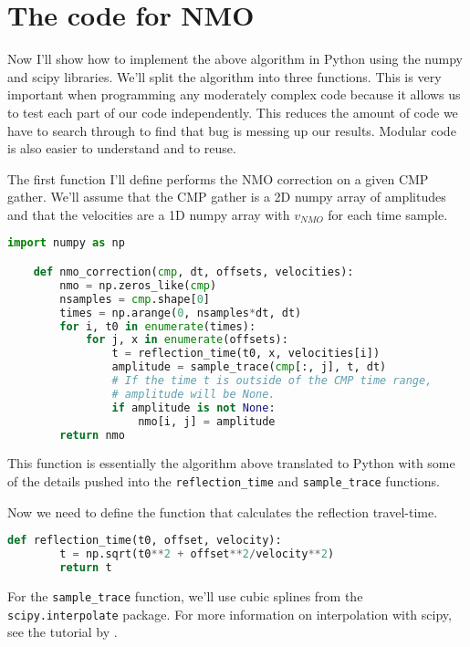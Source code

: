 \section{The code for NMO}

Now I'll show how to implement the above algorithm in Python using the numpy and scipy libraries.
We'll split the algorithm into three functions.
This is very important when programming any moderately complex code because it allows us to test each part of our code independently.
This reduces the amount of code we have to search through to find that bug is messing up our results.
Modular code is also easier to understand and to reuse.

The first function I'll define performs the NMO correction on a given CMP gather.
We'll assume that the CMP gather is a 2D numpy array of amplitudes and that the
velocities are a 1D numpy array with $v_{NMO}$ for each time sample.

\begin{lstlisting}[language=python]
    import numpy as np

    def nmo_correction(cmp, dt, offsets, velocities):
        nmo = np.zeros_like(cmp)
        nsamples = cmp.shape[0]
        times = np.arange(0, nsamples*dt, dt)
        for i, t0 in enumerate(times):
            for j, x in enumerate(offsets):
                t = reflection_time(t0, x, velocities[i])
                amplitude = sample_trace(cmp[:, j], t, dt)
                # If the time t is outside of the CMP time range,
                # amplitude will be None.
                if amplitude is not None:
                    nmo[i, j] = amplitude
        return nmo
\end{lstlisting}

This function is essentially the algorithm above translated to Python with some
of the details pushed into the \texttt{reflection\_time} and
\texttt{sample\_trace} functions.

Now we need to define the function that calculates the reflection travel-time.

\begin{lstlisting}[language=python]
    def reflection_time(t0, offset, velocity):
        t = np.sqrt(t0**2 + offset**2/velocity**2)
        return t
\end{lstlisting}

For the \texttt{sample\_trace} function, we'll use cubic splines from the
\texttt{scipy.interpolate} package.
For more information on interpolation with scipy, see the tutorial by
\citet{Hall_2016}.

